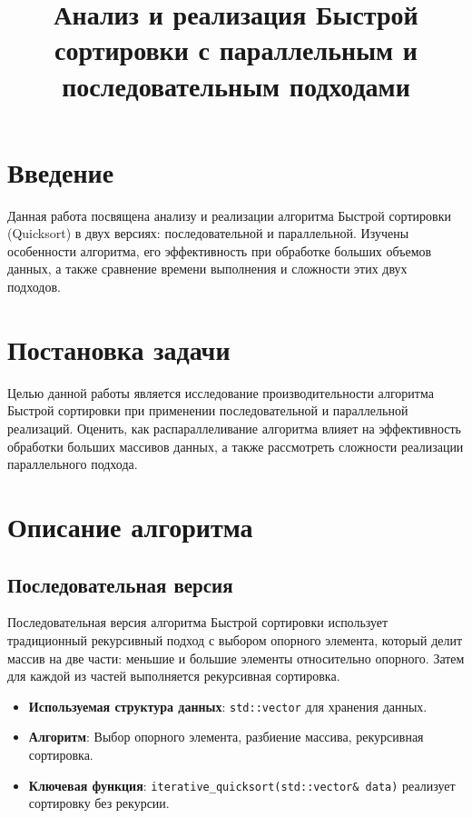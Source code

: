 \documentclass[a4paper,12pt]{article}
\begin{document}
\title{Анализ и реализация Быстрой сортировки с параллельным и последовательным подходами}
\author{}
\date{}
\maketitle

\section*{Введение}
Данная работа посвящена анализу и реализации алгоритма Быстрой сортировки (Quicksort) в двух версиях: последовательной и параллельной. Изучены особенности алгоритма, его эффективность при обработке больших объемов данных, а также сравнение времени выполнения и сложности этих двух подходов.

\section*{Постановка задачи}
Целью данной работы является исследование производительности алгоритма Быстрой сортировки при применении последовательной и параллельной реализаций. Оценить, как распараллеливание алгоритма влияет на эффективность обработки больших массивов данных, а также рассмотреть сложности реализации параллельного подхода.

\section*{Описание алгоритма}
\subsection*{Последовательная версия}
Последовательная версия алгоритма Быстрой сортировки использует традиционный рекурсивный подход с выбором опорного элемента, который делит массив на две части: меньшие и большие элементы относительно опорного. Затем для каждой из частей выполняется рекурсивная сортировка.

\begin{itemize}
\item \textbf{Используемая структура данных}: \texttt{std::vector} для хранения данных.
\item \textbf{Алгоритм}: Выбор опорного элемента, разбиение массива, рекурсивная сортировка.
\item \textbf{Ключевая функция}: \texttt{iterative\_quicksort(std::vector\& data)} реализует сортировку без рекурсии.
\end{itemize}
\end{document}
